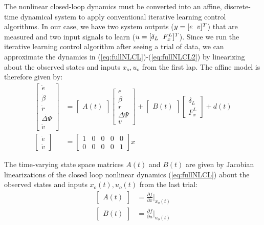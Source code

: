 \documentclass[9pt,shortpaper,twoside,web]{ieeecolor}
\begin{document}
{{{The nonlinear closed-loop dynamics must be converted into an affine, discrete-time dynamical system to apply conventional iterative learning
control algorithms. In our case, we have two system outputs ($y = [e \hspace{2mm} v]^T$) that are measured and two input signals to learn ($u = [\delta_L \hspace{2mm} F^L_x]^T$). 
Since we run the iterative learning control algorithm after seeing a trial of data, we can approximate
the dynamics in (\ref{eq:fullNLCL})-(\ref{eq:fullNLCL2}) by linearizing about the observed states and inputs $x_o, u_o$ from the first lap. The affine model is therefore given by: 
 \begin{align}
 \label{eq:ssMAT}
 \begin{bmatrix} \dot{e} \\ \dot{\beta} \\ \dot{r} \\ \dot{\Delta\Psi} \\ \dot{v}\end{bmatrix} &= \begin{bmatrix} A(t) \end{bmatrix} \begin{bmatrix} e \\ \beta \\ r \\ \Delta\Psi \\ v \end{bmatrix} + \begin{bmatrix} B(t) \end{bmatrix} \begin{bmatrix} \delta_L \\ F^L_x \end{bmatrix} + d(t) \\
 \begin{bmatrix} \dot{e} \\ \dot{v} \end{bmatrix}  &= \begin{bmatrix} 1 & 0 & 0 & 0 & 0 \\ 0 & 0 & 0 & 0 & 1 \end{bmatrix} x
 \end{align}
 
 The time-varying state space matrices $A(t)$ and $B(t)$ are given by Jacobian linearizations of the closed loop nonlinear dynamics (\ref{eq:fullNLCL}) about the observed states and inputs $x_o(t), u_o(t)$ from the last trial:
 \begin{align}
 \label{eq:C4nl}
 \begin{bmatrix} A(t) \end{bmatrix} &= \frac{\partial{f}}{\partial{x}}\Big|_{x_o(t)} \\
 \begin{bmatrix} B(t) \end{bmatrix} &= \frac{\partial{f}}{\partial{u}}\Big|_{u_o(t)}
 \end{align}

}}}
\end{document}
